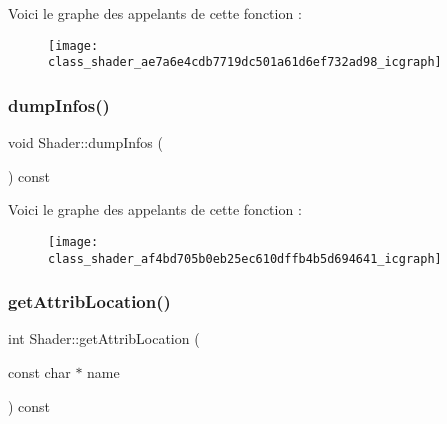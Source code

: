 Voici le graphe des appelants de cette fonction \+:\nopagebreak
\begin{figure}[H]
\begin{center}
\leavevmode
\texttt{[image: class\_shader\_ae7a6e4cdb7719dc501a61d6ef732ad98\_icgraph]}
\end{center}
\end{figure}
\mbox{\label{class_shader_af4bd705b0eb25ec610dffb4b5d694641}} 
\subsubsection{\texorpdfstring{dump\+Infos()}{dumpInfos()}}
{\footnotesize\ttfamily void Shader\+::dump\+Infos (\begin{DoxyParamCaption}{ }\end{DoxyParamCaption}) const}

Voici le graphe des appelants de cette fonction \+:\nopagebreak
\begin{figure}[H]
\begin{center}
\leavevmode
\texttt{[image: class\_shader\_af4bd705b0eb25ec610dffb4b5d694641\_icgraph]}
\end{center}
\end{figure}
\mbox{\label{class_shader_a4287e8012d956746f99cf8d1d6a126f8}} 
\subsubsection{\texorpdfstring{get\+Attrib\+Location()}{getAttribLocation()}}
{\footnotesize\ttfamily int Shader\+::get\+Attrib\+Location (\begin{DoxyParamCaption}\item[{const char $\ast$}]{name }\end{DoxyParamCaption}) const}

